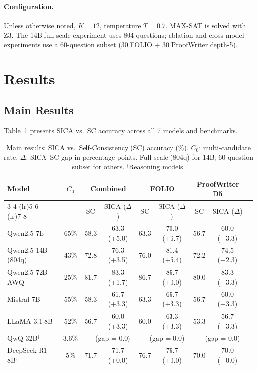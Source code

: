 \documentclass[11pt,a4paper]{article}
\begin{document}
\paragraph{Configuration.} Unless otherwise noted, $K=12$, temperature $T=0.7$. MAX-SAT is solved with Z3. The 14B full-scale experiment uses 804 questions; ablation and cross-model experiments use a 60-question subset (30 FOLIO + 30 ProofWriter depth-5).

\section{Results}
\label{sec:results}

\subsection{Main Results}
\label{sec:main_results}

Table~\ref{tab:main} presents SICA vs.\ SC accuracy across all 7 models and benchmarks.

\begin{table}[t]
\centering
\small
\caption{Main results: SICA vs.\ Self-Consistency (SC) accuracy (\%). $C_0$: multi-candidate rate. $\Delta$: SICA--SC gap in percentage points. Full-scale (804q) for 14B; 60-question subset for others. $^\dagger$Reasoning models.}
\label{tab:main}
\begin{tabular}{lcccccccc}
\toprule
\textbf{Model} & \textbf{$C_0$} & \multicolumn{2}{c}{\textbf{Combined}} & \multicolumn{2}{c}{\textbf{FOLIO}} & \multicolumn{2}{c}{\textbf{ProofWriter D5}} \\
\cmidrule(lr){3-4} \cmidrule(lr){5-6} \cmidrule(lr){7-8}
& & SC & SICA ($\Delta$) & SC & SICA ($\Delta$) & SC & SICA ($\Delta$) \\
\midrule
Qwen2.5-7B  & 65\% & 58.3 & 63.3 (+5.0) & 63.3 & 70.0 (+6.7) & 56.7 & 60.0 (+3.3) \\
Qwen2.5-14B (804q) & 43\% & 72.8 & 76.3 (+3.5) & 76.0 & 81.4 (+5.4) & 72.2 & 74.5 (+2.3) \\
Qwen2.5-72B-AWQ & 25\% & 81.7 & 83.3 (+1.7) & 86.7 & 86.7 (+0.0) & 80.0 & 83.3 (+3.3) \\
Mistral-7B  & 55\% & 58.3 & 61.7 (+3.3) & 63.3 & 66.7 (+3.3) & 56.7 & 60.0 (+3.3) \\
LLaMA-3.1-8B & 52\% & 56.7 & 60.0 (+3.3) & 60.0 & 63.3 (+3.3) & 53.3 & 56.7 (+3.3) \\
\midrule
QwQ-32B$^\dagger$ & 3.6\% & \multicolumn{2}{c}{--- (gap = 0.0)} & \multicolumn{2}{c}{--- (gap = 0.0)} & \multicolumn{2}{c}{--- (gap = 0.0)} \\
DeepSeek-R1-8B$^\dagger$ & 5\% & 71.7 & 71.7 (+0.0) & 76.7 & 76.7 (+0.0) & 70.0 & 70.0 (+0.0) \\
\bottomrule
\end{tabular}
\end{table}
\end{document}
